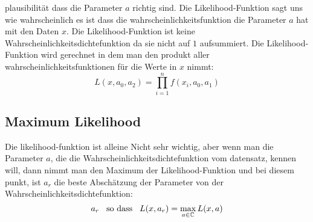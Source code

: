 \documentclass{article}
\newcommand{\smspc}{\hspace{0.3cm}}
\begin{document}
plausibilität dass die Parameter $a$ richtig sind. Die Likelihood-Funktion sagt uns wie wahrscheinlich es ist dass die wahrscheinlichkeitsfunktion die Parameter $a$ hat mit den Daten $x$. Die Likelihood-Funktion ist keine Wahrscheinlichkeitsdichtefunktion da sie nicht auf $1$ aufsummiert.
\newline Die Likelihood-Funktion wird gerechnet in dem man den produkt aller wahrscheinlichkeitsfunktionen für die Werte in $x$ nimmt:
\[L(x,a_0,a_2)=\prod_{i=1}^nf(x_i, a_0, a_1)\]
\hypertarget{maxlikelihood}{\subsection*{Maximum Likelihood}}Die likelihood-funktion ist alleine Nicht sehr wichtig, aber wenn man die Parameter $a$, die die Wahrscheinlichkeitsdichtefunktion vom datensatz, kennen will, dann nimmt man den Maximum der Likelihood-Funktion und bei diesem punkt, ist $a_r$ die beste Abschätzung der Parameter von der Wahrscheinlichkeitsdichtefunktion: \[a_r \smspc \text{so dass} \smspc L(x,a_r)=\max_{a\in \mathbb{C}}L(x,a)\]
\end{document}
